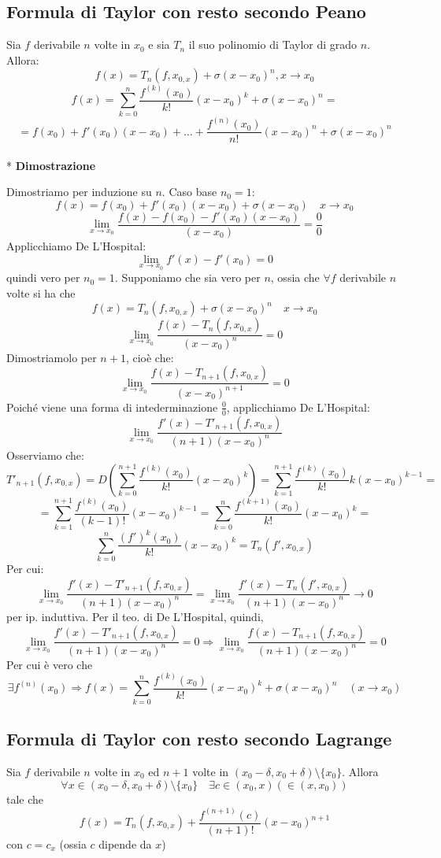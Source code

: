 \documentclass[12pt]{article}
\begin{document}
\subsection{Formula di Taylor con resto secondo Peano}
Sia $f$ derivabile $n$ volte in $x_0$ e sia
$T_n$ il suo polinomio di Taylor di grado $n$.
Allora:
\[f(x) = T_n(f,x_{0,x}) + \sigma(x-x_0)^n, x \to x_0\]
\[f(x) = \sum_{k=0}^{n}\frac{f^{(k)}(x_0)}{k!}(x-x_0)^k + \sigma(x-x_0)^n =\]
\[ = f(x_0) + f'(x_0)(x-x_0)+\dots+\frac{f^{(n)}(x_0)}{n!}(x-x_0)^n + \sigma(x-x_0)^n \] \\*
\textbf{Dimostrazione}

Dimostriamo per induzione su $n$. Caso base $n_0 = 1$: 
\[ f(x) = f(x_0) + f'(x_0)(x-x_0)+\sigma(x-x_0) \quad x\to x_0\]
\[ \lim_{x \to x_0} \frac{f(x)-f(x_0) -f'(x_0)(x-x_0)}{(x-x_0)} = \frac{0}{0}\]
Applicchiamo De L'Hospital: 
\[ \lim_{x \to x_0} f'(x) - f'(x_0) = 0\] 
quindi vero per $n_0 = 1$. Supponiamo che sia vero per $n$, ossia che 
$\forall f$ derivabile $n$ volte si ha che 
\[f(x) = T_n(f, x_{0,x}) + \sigma(x-x_0)^n \quad x \to x_0 \]
\[ \lim_{x \to x_0} \frac{f(x) - T_{n}(f, x_{0,x})}{(x-x_0)^{n}} = 0\]
Dimostriamolo per $n+1$, cioè che:\\
\[ \lim_{x \to x_0} \frac{f(x) - T_{n+1}(f, x_{0,x})}{(x-x_0)^{n+1}} = 0 \]
Poiché viene una forma di intederminazione $\frac{0}{0}$,
applicchiamo De L'Hospital:
\[ \lim_{x \to x_0} \frac{f'(x) - T'_{n+1}(f,x_{0,x})}{(n+1)(x-x_0)^n} \]
Osserviamo che:\\
\[ T'_{n+1}(f,x_{0,x}) = D(\sum_{k=0}^{n+1}\frac{f^{(k)}(x_0)}{k!}(x-x_0)^k) = \sum_{k=1}^{n+1}\frac{f^{(k)}(x_0)}{k!}k(x-x_0)^{k-1} = \]
\[ = \sum_{k=1}^{n+1}\frac{f^{(k)}(x_0)}{(k-1)!}(x-x_0)^{k-1} = \sum_{k=0}^{n}\frac{f^{(k+1)}(x_0)}{k!}(x-x_0)^{k} = \]
\[ \sum_{k=0}^{n}\frac{(f')^k(x_0)}{k!}(x-x_0)^{k} = T_n(f',x_{0,x})\]
Per cui:
\[ \lim_{x \to x_0} \frac{f'(x) - T'_{n+1}(f,x_{0,x})}{(n+1)(x-x_0)^n} = \lim_{x \to x_0} \frac{f'(x) - T_n(f',x_{0,x})}{(n+1)(x-x_0)^n} \to 0\] per ip. induttiva. Per il teo. di De L'Hospital, quindi,
\[ \lim_{x \to x_0} \frac{f'(x) - T'_{n+1}(f,x_{0,x})}{(n+1)(x-x_0)^n} = 0 \Rightarrow \lim_{x \to x_0} \frac{f(x) - T_{n+1}(f,x_{0,x})}{(n+1)(x-x_0)^n} = 0\]
Per cui è vero che
\[ \exists f^{(n)}(x_0) \Rightarrow f(x) = \sum_{k=0}^{n}\frac{f^{(k)}(x_0)}{k!}(x-x_0)^k + \sigma (x-x_0)^n \quad (x\to x_0)\]

\subsection{Formula di Taylor con resto secondo Lagrange}
Sia $f$ derivabile $n$ volte in $x_0$ ed $n+1$ volte
in $(x_0 - \delta, x_0 + \delta) \setminus \{x_0\}$. Allora 
\[ 
\forall x \in (x_0 - \delta, x_0 + \delta) \setminus \{x_0\} \quad \exists c \in (x_0, x) (\in(x, x_0))
\] 
tale che 
\[ 
f(x) = T_n(f, x_{0,x}) + \frac{f^{(n+1)}(c)}{(n+1)!}(x-x_0)^{n+1} 
\]
con $c=c_x$ (ossia $c$ dipende da $x$)
\end{document}
